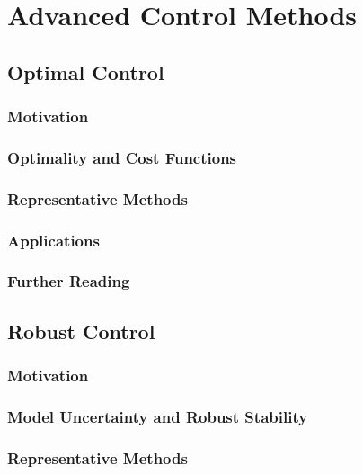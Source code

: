\chapter{Advanced Control Methods}

	\section{Optimal Control} \label{ch:optimal}

    		\subsection{Motivation}

    		\subsection{Optimality and Cost Functions}

    		\subsection{Representative Methods}

    		\subsection{Applications}

    		\subsection{Further Reading}

	\section{Robust Control} \label{ch:robust}

		\subsection{Motivation}

    		\subsection{Model Uncertainty and Robust Stability}

    		\subsection{Representative Methods}

